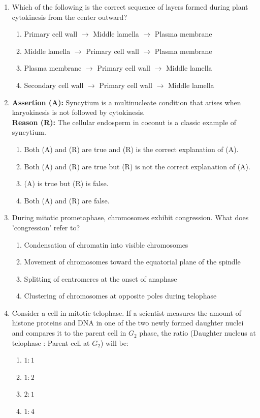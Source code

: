 \documentclass[11pt,a4paper]{article}
\begin{document}
\begin{enumerate}[label=\textbf{\arabic*.}, leftmargin=*]
\item Which of the following is the correct sequence of layers formed during plant cytokinesis from the center outward?
\begin{enumerate}[label=(\alph*)]
    \item Primary cell wall $\rightarrow$ Middle lamella $\rightarrow$ Plasma membrane
    \item Middle lamella $\rightarrow$ Primary cell wall $\rightarrow$ Plasma membrane
    \item Plasma membrane $\rightarrow$ Primary cell wall $\rightarrow$ Middle lamella
    \item Secondary cell wall $\rightarrow$ Primary cell wall $\rightarrow$ Middle lamella
\end{enumerate}

\item \textbf{Assertion (A):} Syncytium is a multinucleate condition that arises when karyokinesis is not followed by cytokinesis.\\
\textbf{Reason (R):} The cellular endosperm in coconut is a classic example of syncytium.
\begin{enumerate}[label=(\alph*)]
    \item Both (A) and (R) are true and (R) is the correct explanation of (A).
    \item Both (A) and (R) are true but (R) is not the correct explanation of (A).
    \item (A) is true but (R) is false.
    \item Both (A) and (R) are false.
\end{enumerate}

\item During mitotic prometaphase, chromosomes exhibit congression. What does 'congression' refer to?
\begin{enumerate}[label=(\alph*)]
    \item Condensation of chromatin into visible chromosomes
    \item Movement of chromosomes toward the equatorial plane of the spindle
    \item Splitting of centromeres at the onset of anaphase
    \item Clustering of chromosomes at opposite poles during telophase
\end{enumerate}

\item Consider a cell in mitotic telophase. If a scientist measures the amount of histone proteins and DNA in one of the two newly formed daughter nuclei and compares it to the parent cell in $G_2$ phase, the ratio (Daughter nucleus at telophase : Parent cell at $G_2$) will be:
\begin{enumerate}[label=(\alph*)]
    \item $1 : 1$
    \item $1 : 2$
    \item $2 : 1$
    \item $1 : 4$
\end{enumerate}

\end{enumerate}
\end{document}
